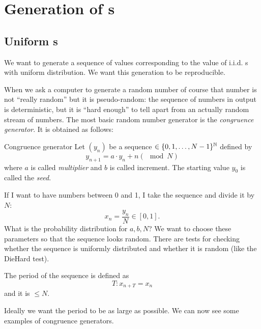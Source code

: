 \documentclass[12pt]{report}
\begin{document}
\section{Generation of \rv s}
\subsection{Uniform \rv s}
We want to generate a sequence of values corresponding to the value of i.i.d. \rv s with uniform distribution. We want this generation to be reproducible.\par
When we ask a computer to generate a random number of course that number is not ``really random'' but it is pseudo-random: the sequence of numbers in output is deterministic, but it is ``hard enough'' to tell apart from an actually random stream of numbers. The most basic random number generator is the \emph{congruence generator}. It is obtained as follows:
\begin{algobox}{Congruence generator}
	Let $(y_{n})$ be a sequence $\in\{0,1,\ldots,N-1\}^{\mathbb{N}}$ defined by
	\begin{equation*}
		y_{n+1}=a\cdot y_{n}+n(\mod N)
	\end{equation*}
	where $a$ is called \emph{multiplier} and $b$ is called increment. The starting value $y_{0}$ is called the \emph{seed}.
\end{algobox}
If I want to have numbers between 0 and 1, I take the sequence and divide it by $N$:
\begin{equation*}
	x_{n}=\frac{y_{n}}{N}\in[0,1].
\end{equation*}
What is the probability distribution for $a,b,N$? We want to choose these parameters so that the sequence looks random. There are tests for checking whether the sequence is uniformly distributed and whether it is random (like the DieHard test).\par
\begin{definition}
	The period of the sequence is defined as
	\begin{equation*}
		T:x_{n+T}=x_{n}
	\end{equation*}
	and it is $\leq N$.
\end{definition}
Ideally we want the period to be as large as possible. We can now see some examples of congruence generators.
\end{document}
